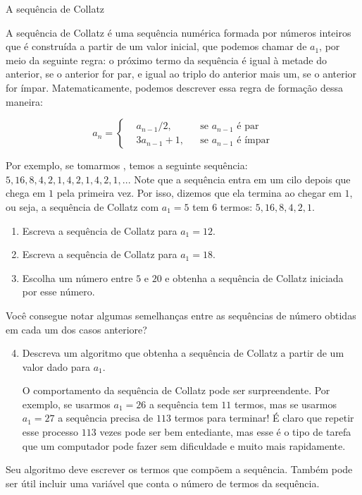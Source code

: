 \begin{task}{A sequência de Collatz}

A sequência de Collatz é uma sequência numérica formada por números inteiros que é construída a partir de um valor inicial, que podemos chamar de $a_1$, por meio da seguinte regra: o próximo termo da sequência é igual à metade do anterior, se o anterior for par, e igual ao triplo do anterior mais um, se o anterior for ímpar. Matematicamente, podemos descrever essa regra de formação dessa maneira:

$$a_n=\left \{
\begin{aligned}
&a_{n-1}/2, & & \text{se }a_{n-1}\text{ é par} \\
&3a_{n-1}+1, & & \text{se }a_{n-1}\text{ é ímpar} 
\end{aligned}
\right.$$

Por exemplo, se tomarmos , temos a seguinte sequência: $5, 16, 8, 4, 2, 1, 4, 2, 1, 4, 2, 1, ..$. Note que a sequência entra em um cilo depois que chega em $1$ pela primeira vez. Por isso, dizemos que ela termina ao chegar em $1$, ou seja, a sequência de Collatz com $a_1=5$ tem $6$ termos: $5, 16, 8, 4, 2, 1$.

\begin{enumerate}
\item Escreva a sequência de Collatz para $a_1=12$.

\item Escreva a sequência de Collatz para $a_1=18$.

\item Escolha um número entre $5$ e $20$ e obtenha a sequência de Collatz iniciada por esse número.
\end{enumerate}

\begin{reflection}
Você consegue notar algumas semelhanças entre as sequências de número obtidas em cada um dos casos anteriore?
\end{reflection}

\begin{enumerate}\setcounter{enumi}{3}
\item Descreva um algoritmo que obtenha a sequência de Collatz a partir de um valor dado para $a_1$.

O comportamento da sequência de Collatz pode ser surpreendente. Por exemplo, se usarmos $a_1=26$ a sequência tem $11$ termos, mas se usarmos $a_1=27$ a sequência precisa de $113$ termos para terminar! É claro que repetir esse processo $113$ vezes pode ser bem entediante, mas esse é o tipo de tarefa que um computador pode fazer sem dificuldade e muito mais rapidamente.

\end{enumerate}

\begin{observation}{}
Seu algoritmo deve escrever os termos que compõem a sequência. Também pode ser útil incluir uma variável que conta o número de termos da sequência.
\end{observation}
\end{task}

